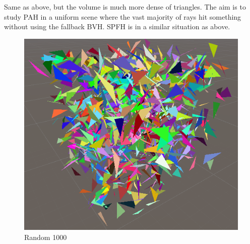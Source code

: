\documentclass{PoliMi_MasterThesis}
\begin{document}
\begin{minipage}{0.55\textwidth}
	Same as above, but the volume is much more dense of triangles. The aim is to study PAH in a uniform scene where the vast majority of rays hit something without using the fallback BVH. SPFH is in a similar situation as above.
\end{minipage}
\hfill \begin{minipage}{0.4\textwidth}
	\begin{figure}[H]
		\includegraphics[width=\textwidth]{Images/random1000_scene.png}
		\caption{Random 1000}
		\label{fig:random_1000}
	\end{figure}
\end{minipage}
\end{document}
